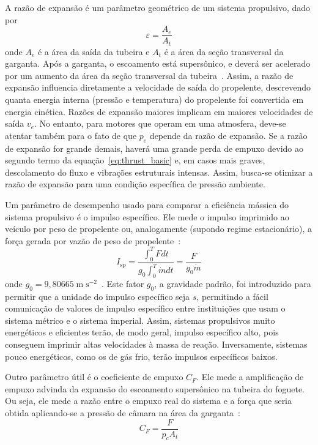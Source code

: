 A razão de expansão é um parâmetro geométrico de um sistema propulsivo, dado por
\begin{equation}
    \label{eq:exp_ratio}
    \varepsilon = \frac{A_e}{A_t}
\end{equation}
onde \(A_e\) é a área da saída da tubeira e \(A_t\) é a área da seção transversal da garganta. Após a garganta, o escoamento está supersônico, e deverá ser acelerado por um aumento da área da seção transversal da tubeira~\cite{anderson}. Assim, a razão de expansão influencia diretamente a velocidade de saída do propelente, descrevendo quanta energia interna (pressão e temperatura) do propelente foi convertida em energia cinética. Razões de expansão maiores implicam em maiores velocidades de saída \(v_e\). No entanto, para motores que operam em uma atmosfera, deve-se atentar também para o fato de que \(p_e\) depende da razão de expansão. Se a razão de expansão for grande demais, haverá uma grande perda de empuxo devido ao segundo termo da equação~\ref{eq:thrust_basic} e, em casos mais graves, descolamento do fluxo e vibrações estruturais intensas. Assim, busca-se otimizar a razão de expansão para uma condição específica de pressão ambiente.

Um parâmetro de desempenho usado para comparar a eficiência mássica do sistema propulsivo é o impulso específico. Ele mede o impulso imprimido ao veículo por peso de propelente ou, analogamente (supondo regime estacionário), a força gerada por vazão de peso de propelente~\cite{Sutton}:
\begin{equation}
    \label{eq:Isp}
    I_{\text{sp}} = \frac{\int^T_0 F dt}{g_0 \int^T_0 \dot{m}dt} = \frac{F}{g_0 \dot{m}}
\end{equation}
onde \(g_0=9,80665\;\mathrm{m}\;\mathrm{s}^{-2}\)~\cite{CGPM}. Este fator \(g_0\), a gravidade padrão, foi introduzido para permitir que a unidade do impulso específico seja \(s\), permitindo a fácil comunicação de valores de impulso específico entre instituições que usam o sistema métrico e o sistema imperial. Assim, sistemas propulsivos muito energéticos e eficientes terão, de modo geral, impulso específico alto, pois conseguem imprimir altas velocidades à massa de reação. Inversamente, sistemas pouco energéticos, como os de gás frio, terão impulsos específicos baixos.

Outro parâmetro útil é o coeficiente de empuxo \(C_F\). Ele mede a amplificação de empuxo advinda da expansão do escoamento supersônico na tubeira do foguete. Ou seja, ele mede a razão entre o empuxo real do sistema e a força que seria obtida aplicando-se a pressão de câmara na área da garganta~\cite{Sutton}:
\begin{equation}
    \label{eq:C_F}
    C_F = \frac{F}{p_c A_t}
\end{equation}

